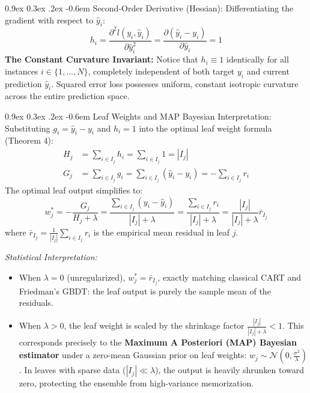 \documentclass[11pt,a4paper]{article}
\makeatletter
\renewcommand\paragraph{\@startsection{paragraph}{4}{\z@}%
                                     {0.9ex \@plus0.3ex \@minus.2ex}%
                                     {-0.6em}%
                                     {\normalfont\normalsize\bfseries}}
\makeatother
\begin{document}
\paragraph{Second-Order Derivative (Hessian):}
Differentiating the gradient with respect to $\hat{y}_i$:
\begin{equation}
    h_i = \frac{\partial^2 l(y_i, \hat{y}_i)}{\partial \hat{y}_i^2} = \frac{\partial (\hat{y}_i - y_i)}{\partial \hat{y}_i} = 1
\end{equation}
\textbf{The Constant Curvature Invariant:} Notice that $h_i \equiv 1$ identically for all instances $i \in \{1, \dots, N\}$, completely independent of both target $y_i$ and current prediction $\hat{y}_i$. Squared error loss possesses uniform, constant isotropic curvature across the entire prediction space.

\paragraph{Leaf Weights and MAP Bayesian Interpretation:}
Substituting $g_i = \hat{y}_i - y_i$ and $h_i = 1$ into the optimal leaf weight formula (Theorem 4):
\begin{align}
    H_j &= \sum_{i \in I_j} h_i = \sum_{i \in I_j} 1 = |I_j| \nonumber \\
    G_j &= \sum_{i \in I_j} g_i = \sum_{i \in I_j} (\hat{y}_i - y_i) = -\sum_{i \in I_j} r_i
\end{align}
The optimal leaf output simplifies to:
\begin{equation}
    w_j^* = -\frac{G_j}{H_j + \lambda} = \frac{\sum_{i \in I_j} (y_i - \hat{y}_i)}{|I_j| + \lambda} = \frac{\sum_{i \in I_j} r_i}{|I_j| + \lambda} = \frac{|I_j|}{|I_j| + \lambda} \bar{r}_{I_j}
\end{equation}
where $\bar{r}_{I_j} = \frac{1}{|I_j|}\sum_{i \in I_j} r_i$ is the empirical mean residual in leaf $j$.

\emph{Statistical Interpretation:}
\begin{itemize}
    \item When $\lambda = 0$ (unregularized), $w_j^* = \bar{r}_{I_j}$, exactly matching classical CART and Friedman's GBDT: the leaf output is purely the sample mean of the residuals.
    \item When $\lambda > 0$, the leaf weight is scaled by the shrinkage factor $\frac{|I_j|}{|I_j| + \lambda} < 1$. This corresponds precisely to the \textbf{Maximum A Posteriori (MAP) Bayesian estimator} under a zero-mean Gaussian prior on leaf weights: $w_j \sim \mathcal{N}\left(0, \frac{\sigma^2}{\lambda}\right)$. In leaves with sparse data ($|I_j| \ll \lambda$), the output is heavily shrunken toward zero, protecting the ensemble from high-variance memorization.
\end{itemize}
\end{document}
